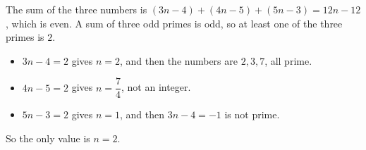 The sum of the three numbers is $(3n-4)+(4n-5)+(5n-3)=12n-12$, which is even. A sum of three odd primes is odd, so at least one of the three primes is $2$.
\begin{itemize}
\item $3n-4=2$ gives $n=2$, and then the numbers are $2,3,7$, all prime.
\item $4n-5=2$ gives $n=\dfrac{7}{4}$, not an integer.
\item $5n-3=2$ gives $n=1$, and then $3n-4=-1$ is not prime.
\end{itemize}
So the only value is $n=\boxed{2}$.
